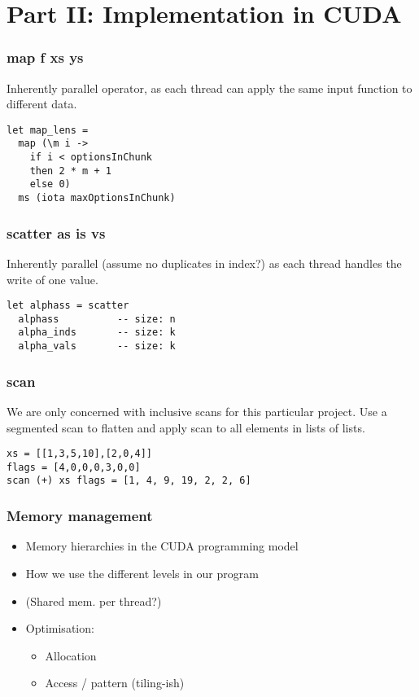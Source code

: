 \section{Part II: Implementation in CUDA}

\begin{frame}[fragile]
  \frametitle{map f xs ys}
%
Inherently parallel operator, as each thread can apply the same input
function to different data.
%
\begin{lstlisting}
let map_lens =
  map (\m i ->
    if i < optionsInChunk
    then 2 * m + 1
    else 0)
  ms (iota maxOptionsInChunk)
\end{lstlisting}
%
\end{frame}

\begin{frame}[fragile]
  \frametitle{scatter as is vs}
%
Inherently parallel (assume no duplicates in index?) as each thread
handles the write of one value.
%
%
\begin{lstlisting}
let alphass = scatter
  alphass          -- size: n
  alpha_inds       -- size: k
  alpha_vals       -- size: k
\end{lstlisting}
%
\end{frame}

\begin{frame}[fragile]
  \frametitle{scan}
%
We are only concerned with inclusive scans for this particular project. 
Use a segmented scan to flatten and apply scan to all elements in lists of lists.
%
%
\begin{lstlisting}
xs = [[1,3,5,10],[2,0,4]]
flags = [4,0,0,0,3,0,0]
scan (+) xs flags = [1, 4, 9, 19, 2, 2, 6]
\end{lstlisting}
\end{frame}

\begin{frame}
  \frametitle{Memory management}
  \begin{itemize}
    \item Memory hierarchies in the CUDA programming model
    \item How we use the different levels in our program
    \item (Shared mem. per thread?)
    \item Optimisation:
      \begin{itemize}
        \item Allocation
        \item Access / pattern (tiling-ish)
      \end{itemize}
  \end{itemize}
\end{frame}
